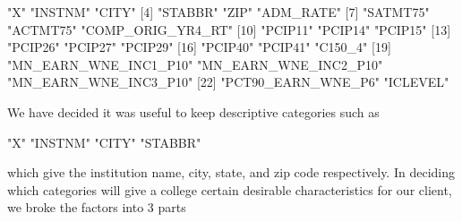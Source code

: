 \documentclass{article}
\begin{document}
\begin{Schunk}
\begin{Soutput}
 [1] "X"                    "INSTNM"               "CITY"                
 [4] "STABBR"               "ZIP"                  "ADM_RATE"            
 [7] "SATMT75"              "ACTMT75"              "COMP_ORIG_YR4_RT"    
[10] "PCIP11"               "PCIP14"               "PCIP15"              
[13] "PCIP26"               "PCIP27"               "PCIP29"              
[16] "PCIP40"               "PCIP41"               "C150_4"              
[19] "MN_EARN_WNE_INC1_P10" "MN_EARN_WNE_INC2_P10" "MN_EARN_WNE_INC3_P10"
[22] "PCT90_EARN_WNE_P6"    "ICLEVEL"             
\end{Soutput}
\end{Schunk}
We have decided it was useful to keep descriptive categories such as 
\begin{Schunk}
\begin{Soutput}
[1] "X"      "INSTNM" "CITY"   "STABBR"
\end{Soutput}
\end{Schunk}

which give the institution name, city, state, and zip code respectively.  In deciding which categories will give a college certain desirable characteristics for our client, we broke the factors into 3 parts
\end{document}
